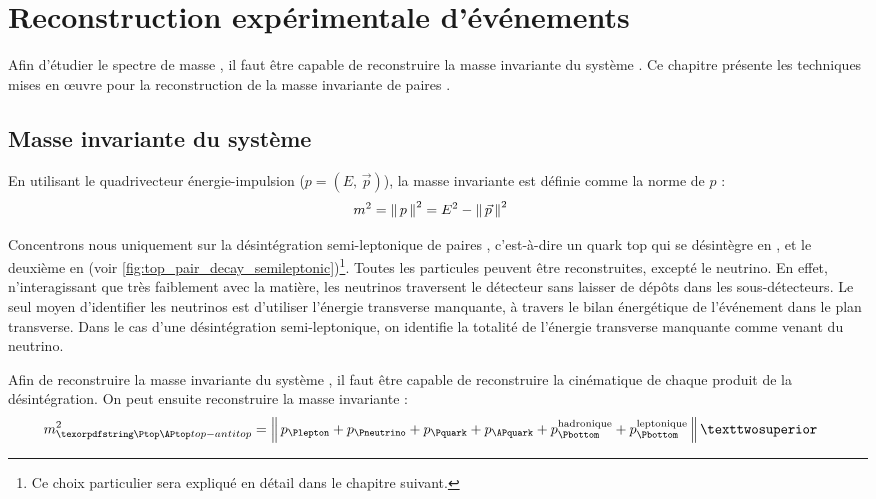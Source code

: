 \chapter{Reconstruction expérimentale d'événements \ttbar} \label{chap:mtt_reco}

Afin d'étudier le spectre de masse \mtt, il faut être capable de reconstruire la masse invariante du système \ttbar. Ce chapitre présente les techniques mises en œuvre pour la reconstruction de la masse invariante de paires \ttbar.

\section{Masse invariante du système \ttbar}

En utilisant le quadrivecteur énergie-impulsion ($p = \left(E,\,\vec{p}\right)$), la masse invariante est définie comme la norme de $p$ :
\begin{align*}
  m^2 &= \left\lVert \, p \, \right\rVert^2 = E^2 - \left\lVert \, \vec{p} \, \right\rVert^2
\end{align*}

Concentrons nous uniquement sur la désintégration semi-leptonique de paires \ttbar, c'est-à-dire un quark top qui se désintègre en \Plepton{}\Pneutrino{}\Pbottom, et le deuxième en \Pbottom{}\Pquark{}\APquark (voir \cref{fig:top_pair_decay_semileptonic})\footnote{Ce choix particulier sera expliqué en détail dans le chapitre suivant.}. Toutes les particules peuvent être reconstruites, excepté le neutrino. En effet, n'interagissant que très faiblement avec la matière, les neutrinos traversent le détecteur sans laisser de dépôts dans les sous-détecteurs. Le seul moyen d'identifier les neutrinos est d'utiliser l'énergie transverse manquante, à travers le bilan énergétique de l'événement dans le plan transverse. Dans le cas d'une désintégration \ttbar semi-leptonique, on identifie la totalité de l'énergie transverse manquante comme venant du neutrino.

Afin de reconstruire la masse invariante du système \ttbar, il faut être capable de reconstruire la cinématique de chaque produit de la désintégration. On peut ensuite reconstruire la masse invariante \ttbar :
\begin{align} \label{eq:invariant_mass_tt}
  m_{\ttbar}^2 &= \norm{ p_{\Plepton} + p_{\Pneutrino} + p_{\Pquark} + p_{\APquark} + p_{\Pbottom}^{\text{hadronique}} + p_{\Pbottom}^\text{leptonique} }²
\end{align}

